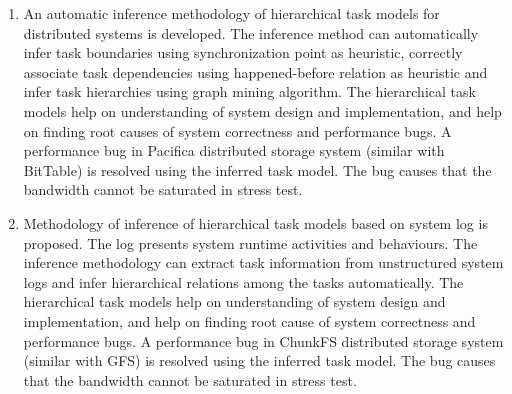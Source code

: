 \begin{eabstract}
\begin{enumerate}
    \item An automatic inference methodology of hierarchical task
    models for distributed systems is developed. The inference method
    can automatically infer task boundaries using synchronization
    point as heuristic, correctly associate task dependencies using
    happened-before relation as heuristic and infer task hierarchies
    using graph mining algorithm.  The hierarchical task models help
    on understanding of system design and implementation, and help on
    finding root causes of system correctness and performance bugs.
    A performance bug in Pacifica distributed storage system (similar
    with BitTable) is resolved using the inferred task model. The
    bug causes that the bandwidth cannot be saturated in stress test.

    \item Methodology of inference of hierarchical task models based
    on system log is proposed. The log presents system runtime
    activities and behaviours. The inference methodology can extract
    task information from unstructured system logs and infer
    hierarchical relations among the tasks automatically. The
    hierarchical task models help on understanding of system design
    and implementation, and help on finding root cause of system
    correctness and performance bugs. A performance bug in ChunkFS
    distributed storage system (similar with GFS) is resolved using
    the inferred task model. The bug causes that the bandwidth cannot
    be saturated in stress test.

  \end{enumerate}

\end{eabstract}

